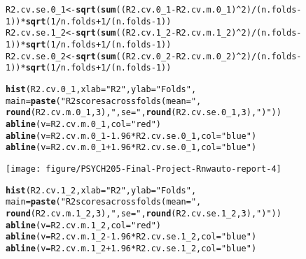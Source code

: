\documentclass{article}\usepackage[]{graphicx}\usepackage[]{xcolor}
\makeatletter
\newcommand{\hlnum}[1]{\textcolor[rgb]{0.686,0.059,0.569}{#1}}%
\newcommand{\hlstr}[1]{\textcolor[rgb]{0.192,0.494,0.8}{#1}}%
\newcommand{\hlopt}[1]{\textcolor[rgb]{0,0,0}{#1}}%
\newcommand{\hlstd}[1]{\textcolor[rgb]{0.345,0.345,0.345}{#1}}%
\newcommand{\hlkwb}[1]{\textcolor[rgb]{0.69,0.353,0.396}{#1}}%
\newcommand{\hlkwc}[1]{\textcolor[rgb]{0.333,0.667,0.333}{#1}}%
\newcommand{\hlkwd}[1]{\textcolor[rgb]{0.737,0.353,0.396}{\textbf{#1}}}%
\newenvironment{kframe}{%
 \def\at@end@of@kframe{}%
 \ifinner\ifhmode%
  \def\at@end@of@kframe{\end{minipage}}%
  \begin{minipage}{\columnwidth}%
 \fi\fi%
 \def\FrameCommand##1{\hskip\@totalleftmargin \hskip-\fboxsep
 \colorbox{shadecolor}{##1}\hskip-\fboxsep
     \hskip-\linewidth \hskip-\@totalleftmargin \hskip\columnwidth}%
 \MakeFramed {\advance\hsize-\width
   \@totalleftmargin\z@ \linewidth\hsize
   \@setminipage}}%
 {\par\unskip\endMakeFramed%
 \at@end@of@kframe}
\newenvironment{knitrout}{}{} %
\makeatother
\begin{document}
\begin{knitrout}
\begin{kframe}
\begin{alltt}
\hlstd{R2.cv.se.0_1} \hlkwb{<-} \hlkwd{sqrt}\hlstd{(}\hlkwd{sum}\hlstd{((R2.cv.0_1} \hlopt{-} \hlstd{R2.cv.m.0_1)}\hlopt{^}\hlnum{2}\hlstd{)}\hlopt{/}\hlstd{(n.folds}\hlopt{-}\hlnum{1}\hlstd{))}\hlopt{*}\hlkwd{sqrt}\hlstd{(}\hlnum{1}\hlopt{/}\hlstd{n.folds} \hlopt{+} \hlnum{1}\hlopt{/}\hlstd{(n.folds}\hlopt{-}\hlnum{1}\hlstd{))}
\hlstd{R2.cv.se.1_2} \hlkwb{<-} \hlkwd{sqrt}\hlstd{(}\hlkwd{sum}\hlstd{((R2.cv.1_2} \hlopt{-} \hlstd{R2.cv.m.1_2)}\hlopt{^}\hlnum{2}\hlstd{)}\hlopt{/}\hlstd{(n.folds}\hlopt{-}\hlnum{1}\hlstd{))}\hlopt{*}\hlkwd{sqrt}\hlstd{(}\hlnum{1}\hlopt{/}\hlstd{n.folds} \hlopt{+} \hlnum{1}\hlopt{/}\hlstd{(n.folds}\hlopt{-}\hlnum{1}\hlstd{))}
\hlstd{R2.cv.se.0_2} \hlkwb{<-} \hlkwd{sqrt}\hlstd{(}\hlkwd{sum}\hlstd{((R2.cv.0_2} \hlopt{-} \hlstd{R2.cv.m.0_2)}\hlopt{^}\hlnum{2}\hlstd{)}\hlopt{/}\hlstd{(n.folds}\hlopt{-}\hlnum{1}\hlstd{))}\hlopt{*}\hlkwd{sqrt}\hlstd{(}\hlnum{1}\hlopt{/}\hlstd{n.folds} \hlopt{+} \hlnum{1}\hlopt{/}\hlstd{(n.folds}\hlopt{-}\hlnum{1}\hlstd{))}

\hlkwd{hist}\hlstd{(R2.cv.0_1,} \hlkwc{xlab}\hlstd{=}\hlstr{"R2"}\hlstd{,} \hlkwc{ylab}\hlstd{=}\hlstr{"Folds"}\hlstd{,}
     \hlkwc{main}\hlstd{=}\hlkwd{paste}\hlstd{(}\hlstr{"R2 scores across folds (mean = "}\hlstd{,}
                \hlkwd{round}\hlstd{(R2.cv.m.0_1,} \hlnum{3}\hlstd{),} \hlstr{", se = "}\hlstd{,} \hlkwd{round}\hlstd{(R2.cv.se.0_1,} \hlnum{3}\hlstd{),} \hlstr{")"}\hlstd{))}
\hlkwd{abline}\hlstd{(}\hlkwc{v}\hlstd{=R2.cv.m.0_1,} \hlkwc{col}\hlstd{=}\hlstr{"red"}\hlstd{)}
\hlkwd{abline}\hlstd{(}\hlkwc{v}\hlstd{=R2.cv.m.0_1} \hlopt{-} \hlnum{1.96}\hlopt{*}\hlstd{R2.cv.se.0_1,} \hlkwc{col}\hlstd{=}\hlstr{"blue"}\hlstd{)}
\hlkwd{abline}\hlstd{(}\hlkwc{v}\hlstd{=R2.cv.m.0_1} \hlopt{+} \hlnum{1.96}\hlopt{*}\hlstd{R2.cv.se.0_1,} \hlkwc{col}\hlstd{=}\hlstr{"blue"}\hlstd{)}
\end{alltt}
\end{kframe}

{\centering \texttt{[image: figure/PSYCH205-Final-Project-Rnwauto-report-4]} 

}


\begin{kframe}\begin{alltt}
\hlkwd{hist}\hlstd{(R2.cv.1_2,} \hlkwc{xlab}\hlstd{=}\hlstr{"R2"}\hlstd{,} \hlkwc{ylab}\hlstd{=}\hlstr{"Folds"}\hlstd{,}
     \hlkwc{main}\hlstd{=}\hlkwd{paste}\hlstd{(}\hlstr{"R2 scores across folds (mean = "}\hlstd{,}
                \hlkwd{round}\hlstd{(R2.cv.m.1_2,} \hlnum{3}\hlstd{),} \hlstr{", se = "}\hlstd{,} \hlkwd{round}\hlstd{(R2.cv.se.1_2,} \hlnum{3}\hlstd{),} \hlstr{")"}\hlstd{))}
\hlkwd{abline}\hlstd{(}\hlkwc{v}\hlstd{=R2.cv.m.1_2,} \hlkwc{col}\hlstd{=}\hlstr{"red"}\hlstd{)}
\hlkwd{abline}\hlstd{(}\hlkwc{v}\hlstd{=R2.cv.m.1_2} \hlopt{-} \hlnum{1.96}\hlopt{*}\hlstd{R2.cv.se.1_2,} \hlkwc{col}\hlstd{=}\hlstr{"blue"}\hlstd{)}
\hlkwd{abline}\hlstd{(}\hlkwc{v}\hlstd{=R2.cv.m.1_2} \hlopt{+} \hlnum{1.96}\hlopt{*}\hlstd{R2.cv.se.1_2,} \hlkwc{col}\hlstd{=}\hlstr{"blue"}\hlstd{)}
\end{alltt}
\end{kframe}


\end{knitrout}
\end{document}
